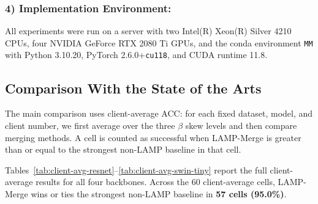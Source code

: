 \documentclass[letterpaper]{article} %
\begin{document}
\subsubsection{4) Implementation Environment:}

All experiments were run on a server with two Intel(R) Xeon(R) Silver 4210 CPUs, four NVIDIA GeForce RTX 2080 Ti GPUs, and the conda environment \texttt{MM} with Python 3.10.20, PyTorch 2.6.0+\texttt{cu118}, and CUDA runtime 11.8.

\subsection{Comparison With the State of the Arts}
The main comparison uses client-average ACC: for each fixed dataset, model, and client number, we first average over the three $\beta$ skew levels and then compare merging methods. A cell is counted as successful when LAMP-Merge is greater than or equal to the strongest non-LAMP baseline in that cell.

Tables~\ref{tab:client-avg-resnet}--\ref{tab:client-avg-swin-tiny} report the full client-average results for all four backbones. Across the 60 client-average cells, LAMP-Merge wins or ties the strongest non-LAMP baseline in \textbf{57 cells (95.0\%)}.
\end{document}
